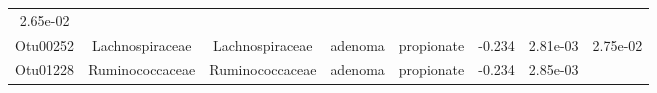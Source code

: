 \documentclass[11pt,]{article}
\begin{document}
\begin{longtable}[]{@{}cccccccc@{}}
\begin{minipage}[t]{0.08\columnwidth}
2.65e-02\strut
\end{minipage}\tabularnewline
\begin{minipage}[t]{0.08\columnwidth}\centering\strut
Otu00252\strut
\end{minipage} & \begin{minipage}[t]{0.15\columnwidth}\centering\strut
Lachnospiraceae\strut
\end{minipage} & \begin{minipage}[t]{0.15\columnwidth}\centering\strut
Lachnospiraceae\strut
\end{minipage} & \begin{minipage}[t]{0.08\columnwidth}\centering\strut
adenoma\strut
\end{minipage} & \begin{minipage}[t]{0.09\columnwidth}\centering\strut
propionate\strut
\end{minipage} & \begin{minipage}[t]{0.07\columnwidth}\centering\strut
-0.234\strut
\end{minipage} & \begin{minipage}[t]{0.08\columnwidth}\centering\strut
2.81e-03\strut
\end{minipage} & \begin{minipage}[t]{0.08\columnwidth}\centering\strut
2.75e-02\strut
\end{minipage}\tabularnewline
\begin{minipage}[t]{0.08\columnwidth}\centering\strut
Otu01228\strut
\end{minipage} & \begin{minipage}[t]{0.15\columnwidth}\centering\strut
Ruminococcaceae\strut
\end{minipage} & \begin{minipage}[t]{0.15\columnwidth}\centering\strut
Ruminococcaceae\strut
\end{minipage} & \begin{minipage}[t]{0.08\columnwidth}\centering\strut
adenoma\strut
\end{minipage} & \begin{minipage}[t]{0.09\columnwidth}\centering\strut
propionate\strut
\end{minipage} & \begin{minipage}[t]{0.07\columnwidth}\centering\strut
-0.234\strut
\end{minipage} & \begin{minipage}[t]{0.08\columnwidth}\centering\strut
2.85e-03\strut
\end{minipage} & \begin{minipage}[t]{0.08\columnwidth}\centering\strut

\end{minipage}
\end{longtable}
\end{document}
